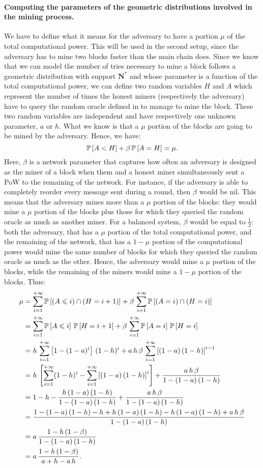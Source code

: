 \paragraph{Computing the parameters  of the geometric distributions  involved in the mining process.} We have to define what it means for the adversary to have a portion \(\mu\) of the total computational power. This will be used in the second setup, since the adversary has to mine two blocks faster than the main chain does. Since we know that we can model the number of tries necessary to mine a block follows a geometric distribution with support \(\mathbf{N}^*\) and whose parameter is a function of the total computational power, we can define two random variables \(H\) and \(A\) which represent the number of times the honest miners (respectively the adversary) have to query the random oracle defined in \cite{Backbone} to manage to mine the block. These two random variables are independent and have respectively one unknown parameter, \(a\) or \(h\). What we know is that a \(\mu\) portion of the blocks are going to be mined by the adversary. Hence, we have:
\[\P{A<H}+\beta\,\P{A=H}=\mu.\]
Here, \(\beta\) is a network parameter that captures how often an adversary is designed as the miner of a block when them and a honest miner simultaneously sent a PoW to the remaining of the network. For instance, if the adversary is able to completely reorder every message sent during a round, then \(\beta\) would be nil. This means that the adversary mines more than a \(\mu\) portion of the blocks: they would mine a \(\mu\) portion of the blocks plus those for which they queried the random oracle as much as another miner. For a balanced system, \(\beta\) would be equal to \(\frac12\): both the adversary, that has a \(\mu\) portion of the total computational power, and the remaining of the network, that has a \(1-\mu\) portion of the computational power would mine the same number of blocks for which they queried the random oracle as much as the other. Hence, the adversary would mine a \(\mu\) portion of the blocks, while the remaining of the miners would mine a \(1-\mu\) portion of the blocks.
Thus:
\begin{align*}
    \mu &= \sum_{i=1}^{+\infty}\P{(A\leqslant i)\cap(H=i+1)} + \beta\,\sum_{i=1}^{+\infty}\P{(A=i)\cap(H=i)}\\
    &= \sum_{i=1}^{+\infty}\P{A\leqslant i}\,\P{H=i+1} + \beta\,\sum_{i=1}^{+\infty}\P{A=i}\,\P{H=i}\\
    &= h\,\sum_{i=1}^{+\infty}\left[1-(1-a)^i\right]\,(1-h)^i + a\,h\,\beta\,\sum_{i=1}^{+\infty}\left[(1-a)\,(1-h)\right]^{i-1}\\
    &= h\,\left[\sum_{i=1}^{+\infty}(1-h)^i-\sum_{i=1}^{+\infty}\left[(1-a)\,(1-h)\right]^i\right] + \frac{a\,h\,\beta}{1-(1-a)\,(1-h)}\\
    &= 1 - h - \frac{h\,(1-a)\,(1-h)}{1-(1-a)\,(1-h)} + \frac{a\,h\,\beta}{1-(1-a)\,(1-h)}\\
    &= \frac{1-(1-a)\,(1-h)-h+h\,(1-a)\,(1-h)-h\,(1-a)\,(1-h)+a\,h\,\beta}{1-(1-a)\,(1-h)}\\
    &= a\,\frac{1-h\,(1-\beta)}{1-(1-a)\,(1-h)}\\
    &= a\,\frac{1-h\,(1-\beta)}{a+h-a\,h}.
\end{align*}

